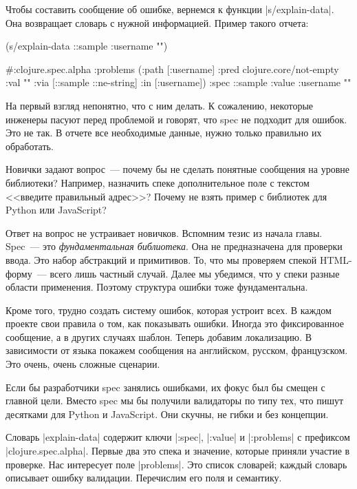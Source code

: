 Чтобы составить сообщение об ошибке, вернемся к функции \spverb|s/explain-data|.
Она возвращает словарь с нужной информацией. Пример такого отчета:

\begin{english}
  \begin{clojure}
(s/explain-data ::sample {:username ""})

#:clojure.spec.alpha
{:problems
 ({:path [:username]
   :pred clojure.core/not-empty
   :val ""
   :via [::sample ::ne-string]
   :in [:username]})
 :spec ::sample
 :value {:username ""}}
  \end{clojure}
\end{english}

На первый взгляд непонятно, что с ним делать. К сожалению, некоторые инженеры
пасуют перед проблемой и говорят, что spec не подходит для ошибок. Это не так. В
отчете все необходимые данные, нужно только правильно их обработать.

Новички задают вопрос~--- почему бы не сделать понятные сообщения на уровне
библиотеки? Например, назначить спеке дополнительное поле с текстом <<введите
правильный адрес>>? Почему не взять пример с библиотек для Python или
JavaScript?

Ответ на вопрос не устраивает новичков. Вспомним тезис из начала главы. Spec~---
это \emph{фундаментальная библиотека}. Она не предназначена для проверки
ввода. Это набор абстракций и примитивов. То, что мы проверяем спекой
HTML-форму~--- всего лишь частный случай. Далее мы убедимся, что у спеки разные
области применения. Поэтому структура ошибки тоже фундаментальна.

Кроме того, трудно создать систему ошибок, которая устроит всех. В каждом
проекте свои правила о том, как показывать ошибки. Иногда это фиксированное
сообщение, а в других случаях шаблон. Теперь добавим локализацию. В зависимости
от языка покажем сообщения на английском, русском, французском. Это очень, очень
сложные сценарии.

Если бы разработчики spec занялись ошибками, их фокус был бы смещен с главной
цели. Вместо spec мы бы получили валидаторы по типу тех, что пишут десятками для
Python и JavaScript. Они скучны, не гибки и без концепции.

Словарь \spverb|explain-data| содержит ключи \spverb|:spec|, \spverb|:value| и
\spverb|:problems| с префиксом \spverb|clojure.spec.alpha|. Первые два это спека
и значение, которые приняли участие в проверке. Нас интересует поле
\spverb|problems|. Это список словарей; каждый словарь описывает ошибку
валидации. Перечислим его поля и семантику.


